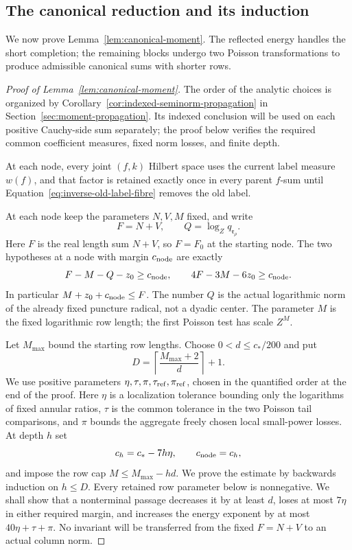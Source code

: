 \documentclass[11pt,a4paper]{article}
\numberwithin{equation}{section}
\numberwithin{figure}{section}
\theoremstyle{definition}
\theoremstyle{remark}
\begin{document}
\subsection{The canonical reduction and its induction}

We now prove Lemma~\ref{lem:canonical-moment}.  The reflected energy
handles the short completion; the remaining blocks undergo two Poisson
transformations to produce admissible canonical sums with shorter rows.

\begin{proof}[Proof of Lemma~\ref{lem:canonical-moment}]
The order of the analytic choices is organized by
Corollary~\ref{cor:indexed-seminorm-propagation} in
Section~\ref{sec:moment-propagation}. Its indexed conclusion will be
used on each positive Cauchy-side sum separately; the proof below verifies
the required common coefficient measures, fixed norm losses, and finite depth.

At each node, every joint \((f,k)\) Hilbert space uses the current label
measure \(w(f)\), and that factor is retained exactly once in every
parent \(f\)-sum until Equation~\eqref{eq:inverse-old-label-fibre}
removes the old label.

At each node keep the parameters \(N,V,M\) fixed, and write
\[
 F=N+V,\qquad Q=\log_Zq_{\mathfrak r_\rho}.
\]
Here \(F\) is the real length sum \(N+V\), so \(F=F_0\) at the starting
node.  The two hypotheses at a node with margin \(c_{\rm node}\) are exactly
\begin{equation}\label{eq:inverse-fixed-invariant}
 F-M-Q-z_0\ge c_{\rm node},\qquad
 4F-3M-6z_0\ge c_{\rm node}.
\end{equation}
In particular \(M+z_0+c_{\rm node}\le F\).  The number \(Q\) is the
actual logarithmic norm of the already fixed puncture radical, not a
dyadic center.  The parameter \(M\) is the fixed logarithmic row length;
the first Poisson test has scale \(Z^M\).

Let \(M_{\max}\) bound the starting row lengths.  Choose
\(0<d\le c_*/200\) and put
\[
 D=\left\lceil\frac{M_{\max}+2}{d}\right\rceil+1.
\]
We use positive parameters \(\eta,\tau,\pi,\tau_{\rm ref},\pi_{\rm ref}\),
chosen in the quantified order at the end of the proof.  Here \(\eta\)
is a localization tolerance bounding only the logarithms of fixed annular
ratios, \(\tau\) is the common tolerance in the two Poisson tail comparisons,
and \(\pi\) bounds the aggregate freely chosen local small-power losses.  At depth
\(h\) set
\[
 c_h=c_*-7h\eta,\qquad c_{\rm node}=c_h,
\]
and impose the row cap \(M\le M_{\max}-hd\).  We prove the estimate by
backwards induction on \(h\le D\).  Every retained row parameter below
is nonnegative.  We shall show that a nonterminal passage decreases it
by at least \(d\), loses at most \(7\eta\) in either required margin,
and increases the energy exponent by at most \(40\eta+\tau+\pi\).
No invariant will be transferred from the fixed \(F=N+V\) to an
actual column norm.


\end{proof}
\end{document}
